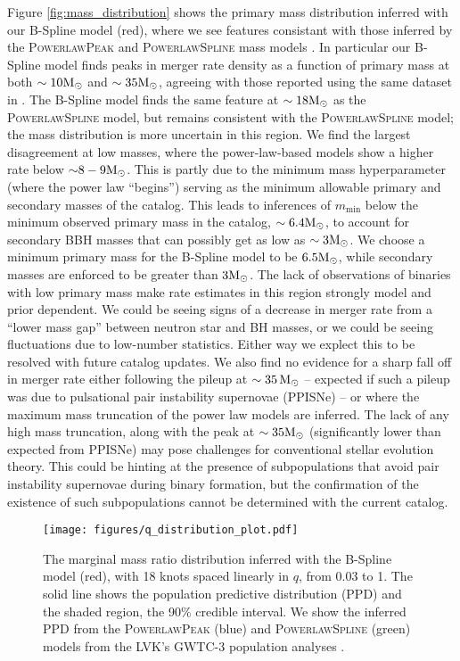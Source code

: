 Figure \ref{fig:mass_distribution} shows the primary mass distribution inferred with our B-Spline model (red), where we see features consistant with those inferred by the \textsc{PowerlawPeak} and \textsc{PowerlawSpline} mass models \citep{Talbot_2018,o3a_pop,Edelman_2022ApJ,o3b_astro_dist}. 
In particular our B-Spline model finds peaks in merger rate density as a function of primary mass at both $\sim10{\rm M}_\odot$ and $\sim35{\rm M}_\odot$, agreeing with those 
reported using the same dataset in \citet{o3b_astro_dist}. The B-Spline model finds the same feature at $\sim18{\rm M}_\odot$ as the \textsc{PowerlawSpline} model, but remains consistent with the \textsc{PowerlawSpline} model; the mass distribution is more uncertain in this region.
We find the largest disagreement at low masses, where the power-law-based models show a higher rate below ${\sim}8-9{\rm M}_\odot$. This is partly due to the minimum mass hyperparameter (where the power law ``begins'') serving as the minimum allowable primary and secondary masses of the catalog. This leads to inferences of $m_\mathrm{min}$ below the minimum observed primary mass in the catalog, $\sim 6.4{\rm M}_\odot$, to account for secondary BBH masses 
that can possibly get as low as $\sim 3{\rm M}_\odot$. We choose a minimum primary mass for 
the B-Spline model to be $6.5{\rm M}_\odot$, while secondary masses are enforced to be greater than $3{\rm M}_\odot$. The lack of observations of binaries with low primary mass make rate estimates in this region strongly model and prior dependent.  We could be seeing signs of a decrease in merger rate from a ``lower mass gap'' between neutron star and BH masses, or we could be seeing fluctuations due to low-number statistics.  Either way we explect this to be resolved with future catalog updates. We also find no evidence for a sharp fall off in merger rate either following 
the pileup at $\sim35\,{\rm M}_\odot$ -- expected if such a pileup was due to pulsational pair instability supernovae (PPISNe) -- or where the maximum mass truncation of the power law models 
are inferred. The lack of any high mass truncation, along with the peak at $\sim35{\rm M}_\odot$ (significantly lower than expected from PPISNe) may pose challenges for conventional stellar 
evolution theory. This could be hinting at the presence of subpopulations that avoid pair instability supernovae during binary formation, but the confirmation of the existence of such subpopulations 
cannot be determined with the current catalog. 

\begin{figure}[h]
    \texttt{[image: figures/q\_distribution\_plot.pdf]}
    \caption{The marginal mass ratio distribution inferred with the B-Spline model (red), with 18 knots spaced linearly in $q$, from 0.03 to 1. 
    The solid line shows the population predictive distribution (PPD) and the shaded region, the 90\% credible interval. 
    We show the inferred PPD from the \textsc{PowerlawPeak} (blue) and \textsc{PowerlawSpline} (green) models from the LVK's 
    GWTC-3 population analyses \citep{o3b_astro_dist}.}
    \label{fig:q_distribution}
\end{figure}

